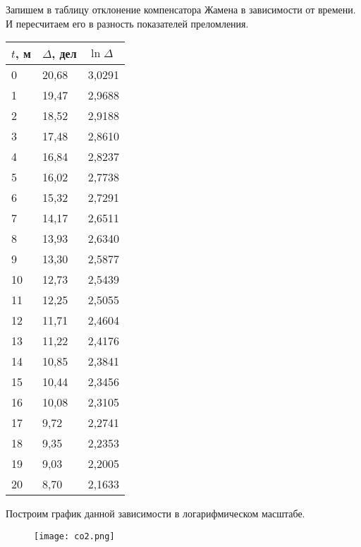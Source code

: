 Запишем в таблицу отклонение компенсатора Жамена в зависимости от времени. И пересчитаем его в разность показателей преломления.
\begin{table}[H]
	\centering
	\begin{tabular}{|l|l|l|}
		\hline
		$t$, м & $\Delta$, дел & $\ln{\Delta}$ \\ \hline
		0      & 20,68         & 3,0291        \\ \hline
		1      & 19,47         & 2,9688        \\ \hline
		2      & 18,52         & 2,9188        \\ \hline
		3      & 17,48         & 2,8610        \\ \hline
		4      & 16,84         & 2,8237        \\ \hline
		5      & 16,02         & 2,7738        \\ \hline
		6      & 15,32         & 2,7291        \\ \hline
		7      & 14,17         & 2,6511        \\ \hline
		8      & 13,93         & 2,6340        \\ \hline
		9      & 13,30         & 2,5877        \\ \hline
		10     & 12,73         & 2,5439        \\ \hline
		11     & 12,25         & 2,5055        \\ \hline
		12     & 11,71         & 2,4604        \\ \hline
		13     & 11,22         & 2,4176        \\ \hline
		14     & 10,85         & 2,3841        \\ \hline
		15     & 10,44         & 2,3456        \\ \hline
		16     & 10,08         & 2,3105        \\ \hline
		17     & 9,72          & 2,2741        \\ \hline
		18     & 9,35          & 2,2353        \\ \hline
		19     & 9,03          & 2,2005        \\ \hline
		20     & 8,70          & 2,1633        \\ \hline
	\end{tabular}
\end{table}

Построим график данной зависимости в логарифмическом масштабе.
\begin{figure}[H]
	\centering
	\texttt{[image: co2.png]}
\end{figure}

